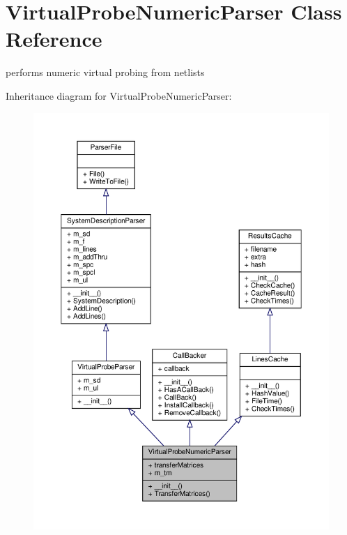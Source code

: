 \hypertarget{classSignalIntegrity_1_1Parsers_1_1VirtualProbeNumericParser_1_1VirtualProbeNumericParser}{}\section{Virtual\+Probe\+Numeric\+Parser Class Reference}
\label{classSignalIntegrity_1_1Parsers_1_1VirtualProbeNumericParser_1_1VirtualProbeNumericParser}


performs numeric virtual probing from netlists  




Inheritance diagram for Virtual\+Probe\+Numeric\+Parser\+:\nopagebreak
\begin{figure}[H]
\begin{center}
\leavevmode
\includegraphics[width=350pt]{classSignalIntegrity_1_1Parsers_1_1VirtualProbeNumericParser_1_1VirtualProbeNumericParser__inherit__graph}
\end{center}
\end{figure}


